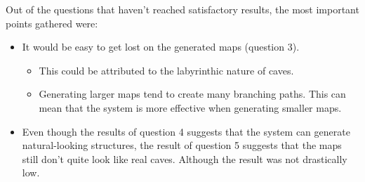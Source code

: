 Out of the questions that haven't reached satisfactory results, the most important points gathered were:
\begin{itemize}
    \item It would be easy to get lost on the generated maps (question 3).
    \begin{itemize}
        \item This could be attributed to the labyrinthic nature of caves.
        \item Generating larger maps tend to create many branching paths. This can mean that the system is more effective when generating smaller maps.
    \end{itemize}
    \item Even though the results of question 4 suggests that the system can generate natural-looking structures, the result of question 5 suggests that the maps still don't quite look like real caves. Although the result was not drastically low. 
\end{itemize}